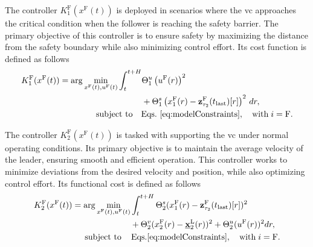 \documentclass[letterpaper, 10 pt, conference]{ieeeconf}
\theoremstyle{definition}
\theoremstyle{nopoint}
\begin{document}
\begin{comment}
	\mathbf{z}_{\bar{\tau}}^\mathrm{F}(t_{\mathrm{last}})[t]
\end{comment}


The controller $K^{\mathrm{F}}_1(x^{\mathrm{F}}(t))$  is deployed in scenarios where the \gls{vc} approaches the critical condition when the follower is reaching the safety barrier. The primary objective of this controller is to ensure safety by maximizing the distance from the safety boundary while also minimizing control effort.  Its cost function is defined as follows
%
%
\begin{equation}
	\label{eq:K_1_controller}
	\begin{aligned}
		K^{\mathrm{F}}_1(x^\mathrm{F}(t)) = \arg \min_{x^{\mathrm{F}}(t), u^{\mathrm{F}}(t)} \int_{t}^{t+H} &  \Theta^u_1\left(u^\mathrm{F}(r)\right)^2  \\  
		& + \Theta^s_1\left(x_1^{\mathrm{F}}(r) - \mathbf{z}_{\tau_2}^\mathrm{F}(t_{\mathrm{last}})[r]\right)^2 \, dr, \\
		&\hspace{-1.9cm} \text{subject to} \quad \text{Eqs.}~\eqref{eq:modelConstraints}, \quad \mathrm{with} \; i = \mathrm{F}.
	\end{aligned}
\end{equation}
%

The controller $K^{\mathrm{F}}_2(x^{\mathrm{F}}(t))$ is tasked with supporting the \gls{vc} under normal operating conditions. Its primary objective is to maintain the average velocity of the leader, ensuring smooth and efficient operation. This controller works to minimize deviations from the desired velocity and position, while also optimizing control effort. Its functional cost is defined as follows
%
%
\begin{equation}
	\label{eq:K_2_controller}
	\begin{aligned}
		K^{\mathrm{F}}_2(x^\mathrm{F}(t)) = \arg  \min_{x^{\mathrm{F}}(t), u^{\mathrm{F}}(t)} &\int_{t}^{t+H} \Theta^s_2(x_1^{\mathrm{F}}(r)-\mathbf{z}_{\tau_2}^\mathrm{F}(t_{\mathrm{last}})[r])^2 \\ &+\Theta^v_2(x_2^{\mathrm{F}}(r)-\underline{\mathbf{x}}_2^\mathrm{L}(r))^2  +  \Theta^u_2(u^{\mathrm{F}}(r))^2 dr, \\
		&	\hspace{-1.9cm} \text{subject to} \qquad \hspace{-1cm}  \qquad \mathrm{Eqs.}\eqref{eq:modelConstraints}, \quad \mathrm{with} \; i = \mathrm{F}.
		\end{aligned}
\end{equation}
\end{document}
